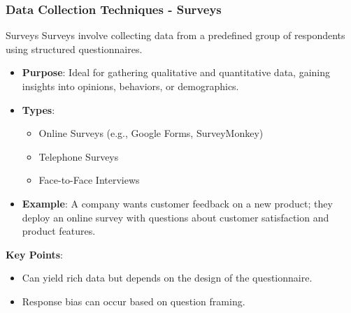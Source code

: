 \documentclass[aspectratio=169]{beamer}
\begin{document}
\begin{frame}
    \frametitle{Data Collection Techniques - Surveys}
    \begin{block}{Surveys}
        Surveys involve collecting data from a predefined group of respondents using structured questionnaires.
    \end{block}
    
    \begin{itemize}
        \item \textbf{Purpose}: Ideal for gathering qualitative and quantitative data, gaining insights into opinions, behaviors, or demographics.
        \item \textbf{Types}:
        \begin{itemize}
            \item Online Surveys (e.g., Google Forms, SurveyMonkey)
            \item Telephone Surveys
            \item Face-to-Face Interviews
        \end{itemize}
        \item \textbf{Example}: A company wants customer feedback on a new product; they deploy an online survey with questions about customer satisfaction and product features.
    \end{itemize}
    
    \textbf{Key Points}:
    \begin{itemize}
        \item Can yield rich data but depends on the design of the questionnaire.
        \item Response bias can occur based on question framing.
    \end{itemize}
\end{frame}
\end{document}
